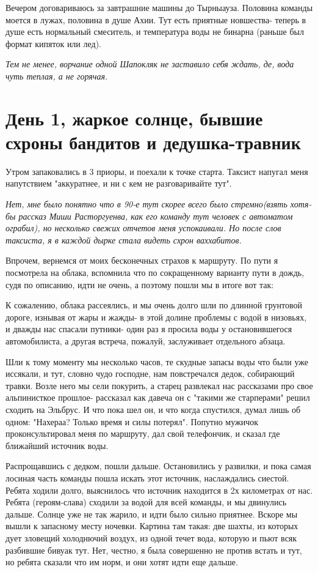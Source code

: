 \documentclass[]{article}
\begin{document}
Вечером договариваюсь за завтрашние машины до Тырныауза. Половина команды моется в лужах, половина в душе Ахии. Тут есть приятные новшества- теперь в душе есть нормальный смеситель, и температура воды не бинарна (раньше был формат кипяток или лед).

\textit{Тем не менее, ворчание одной Шапокляк не заставило себя ждать, де, вода чуть теплая, а не горячая.} 

\section{День 1, жаркое солнце, бывшие схроны бандитов и дедушка-травник}

Утром запаковались в 3 приоры, и поехали к точке старта. Таксист напугал меня напутствием "аккуратнее, и ни с кем не разговаривайте тут". 

\textit{Нет, мне было понятно что в 90-е тут скорее всего было стремно(взять хотя-бы рассказ Миши Расторгуенва, как его команду тут человек с автоматом ограбил), но несколько свежих отчетов меня успокаивали. Но после слов таксиста, я в каждой дырке стала видеть схрон ваххабитов.}

 Впрочем, вернемся от моих бесконечных страхов к маршруту. По пути я посмотрела на облака, вспомнила что по сокращенному варианту пути в дождь, судя по описанию, идти не очень, а поэтому пошли мы в итоге вот так:


К сожалению, облака рассеялись, и мы очень долго шли по длинной грунтовой дороге, изнывая от жары и жажды- в этой долине проблемы с водой в низовьях, и дважды нас спасали путники- один раз я просила воды у остановившегося автомобилиста, а другая встреча, пожалуй, заслуживает отдельного абзаца.

Шли к тому моменту мы несколько часов, те скудные запасы воды что были уже иссякали, и тут, словно чудо господне, нам повстречался дедок, собирающий травки. Возле него мы сели покурить, а старец развлекал  нас рассказами про свое альпинисткое прошлое- рассказал как давеча он с "такими же старперами" решил сходить на Эльбрус. И что пока шел он, и что когда спустился, думал лишь об одном: "Нахераа? Только время и силы потерял". Попутно мужичок проконсультировал меня по маршруту, дал свой телефончик, и сказал где ближайший источник воды.

Распрощавшись с дедком, пошли дальше. Остановились у развилки, и пока самая лосиная часть команды пошла искать этот источник, наслаждались сиестой. Ребята ходили долго, выяснилось что источник находится в 2х километрах от нас. Ребята (героям-слава) сходили за водой для всей команды, и мы двинулись дальше. Солнце уже не так жарило, и идти было сильно приятнее. Вскоре мы вышли к запасному месту ночевки. Картина там такая: две шахты, из которых дует зловещий холоднючий воздух, из одной течет вода, которую и пьют всяк разбившие бивуак тут. Нет, честно, я была совершенно не против встать и тут, но ребята сказали что им норм, и они хотят идти еще дальше. 
\end{document}
